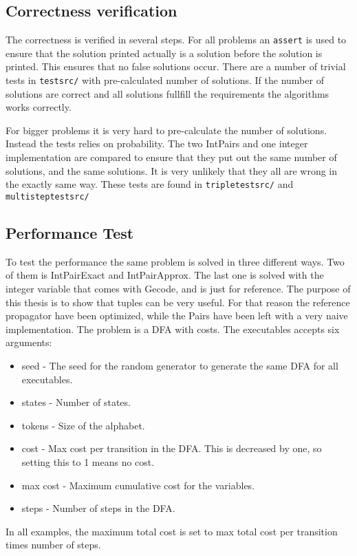 \documentclass[a4paper,11pt]{article}
\begin{document}
\subsection{Correctness verification}
The correctness is verified in several steps. For all problems an \texttt{assert} is used to ensure that the solution printed actually is a solution before the solution is printed. This ensures that no false solutions occur. There are a number of trivial tests in \texttt{testsrc/} with pre-calculated number of solutions. If the number of solutions are correct and all solutions fullfill the requirements the algorithms works correctly.

For bigger problems it is very hard to pre-calculate the number of solutions. Instead the tests relies on probability. The two IntPairs and one integer implementation are compared to ensure that they put out the same number of solutions, and the same solutions. It is very unlikely that they all are wrong in the exactly same way. These tests are found in \texttt{tripletestsrc/} and \texttt{multisteptestsrc/}

\subsection{Performance Test}
To test the performance the same problem is solved in three different ways. Two of them is IntPairExact and IntPairApprox. The last one is solved with the integer variable that comes with Gecode, and is just for reference. The purpose of this thesis is to show that tuples can be very useful. For that reason the reference propagator have been optimized, while the Pairs have been left with a very naive implementation. The problem is a DFA with costs. The executables accepts six arguments: 
\begin{itemize}
\item{seed} - The seed for the random generator to generate the same DFA for all executables.
\item{states} - Number of states.
\item{tokens} - Size of the alphabet.
\item{cost} - Max cost per transition in the DFA. This is decreased by one, so setting this to 1 means no cost.
\item{max cost} - Maximum cumulative cost for the variables.
\item{steps} - Number of steps in the DFA.
\end{itemize}
In all examples, the maximum total cost is set to max total cost per transition times number of steps.
\end{document}
